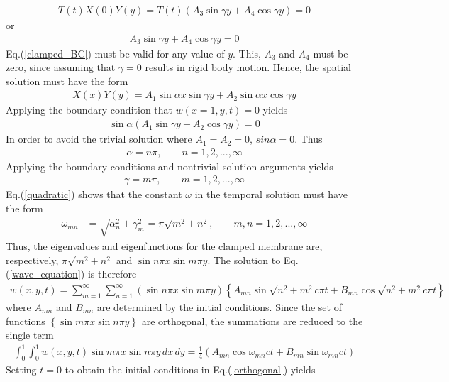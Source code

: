 \documentclass[12pt]{article}
\begin{document}
\begin{align}
	T(t)X(0)Y(y)=T(t)\left(A_3\sin\gamma y+A_4\cos\gamma y\right)=0
\end{align}
or
\begin{align}
	\label{clamped_BC}
	A_3\sin\gamma y+A_4\cos\gamma y=0
\end{align}
Eq.(\ref{clamped_BC}) must be valid for any value of $y$.  This, $A_3$ and $A_4$ must be zero, since assuming that $\gamma=0$ results in rigid body motion.  Hence, the spatial solution must have the form
\begin{align}
	X(x)Y(y)=A_1\sin\alpha x\sin\gamma y+A_2\sin\alpha x\cos\gamma y
\end{align}
Applying the boundary condition that $w(x=1,y,t)=0$ yields
\begin{align}
	\sin\alpha\left(A_1\sin\gamma y+A_2\cos\gamma y\right)=0
\end{align}
In order to avoid the trivial solution where $A_1=A_2=0$, $sin\alpha=0$.  Thus
\begin{align}
	\alpha=n\pi, \qquad n=1,2,...,\infty
\end{align}
Applying the boundary conditions and nontrivial solution arguments yields
\begin{align}
	\gamma=m\pi, \qquad m=1,2,...,\infty
\end{align}
Eq.(\ref{quadratic}) shows that the constant $\omega$ in the temporal solution must have the form
\begin{align}
	\omega_{mn}&=\sqrt{\alpha_n^2+\gamma_m^2}=\pi\sqrt{m^2+n^2}, \qquad m,n=1,2,...,\infty
\end{align}
Thus, the eigenvalues and eigenfunctions for the clamped membrane are, respectively, $\pi\sqrt{m^2+n^2}$ and $\sin n\pi x \sin m\pi y$.  The solution to Eq.(\ref{wave_equation}) is therefore
\begin{align}
w(x,y,t)=\sum_{m=1}^\infty \sum_{n=1}^\infty\left(\sin n\pi x \sin m\pi y\right)\left\{A_{mn}\sin\sqrt{n^2+m^2}c\pi t+B_{mn}\cos\sqrt{n^2+m^2}c\pi t\right\}
\end{align}
where $A_{mn}$ and $B_{mn}$ are determined by the initial conditions.  Since the set of functions $\left\{\sin m\pi x \sin n\pi y\right\}$ are orthogonal, the summations are reduced to the single term
\begin{align}
	\label{orthogonal}
	\int_0^1\int_0^1 w(x,y,t)\sin m\pi x\sin n\pi y \,dx\,dy=\frac{1}{4}\left(A_{mn}\cos\omega_{mn}ct+B_{mn}\sin\omega_{mn}ct\right)
\end{align}
Setting $t=0$ to obtain the initial conditions in Eq.(\ref{orthogonal}) yields
\end{document}
